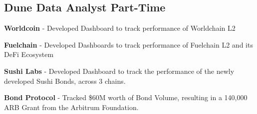 
\subsection*{Dune Data Analyst \hfill Part-Time} 
\begin{zitemize}
    \item \textbf{Worldcoin} - Developed Dashboard to track performance of Worldchain L2
    \item \textbf{Fuelchain} - Developed Dashboards to track performance of Fuelchain L2 and its DeFi Ecosystem
    \item \textbf{Sushi Labs} - Developed Dashboard to track the performance of the newly developed Sushi Bonds, across 3 chains. 
    \item \textbf{Bond Protocol} - Tracked \$60M worth of Bond Volume, resulting in a 140,000 ARB Grant from the Arbitrum Foundation.
\end{zitemize}



